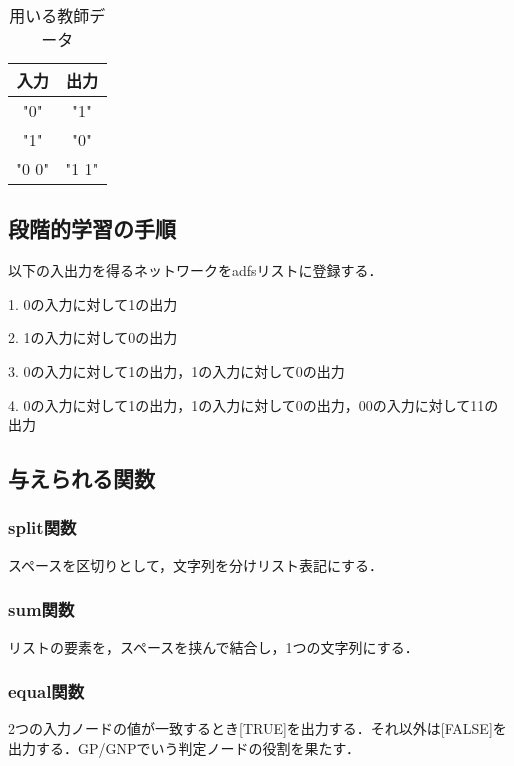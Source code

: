 \documentclass[exploratorypaper]{jsaiart} %
\begin{document}
\begin{table}[htbp]
\centering
\caption{用いる教師データ}
\label{tbl:result}
\begin{tabular}{cc}
    \hline
     入力 & 出力 \\
    \hline
    "0" & "1" \\
    "1" & "0" \\
    "0 0" & "1 1" \\
    \hline
\end{tabular}
\end{table}

\subsection{段階的学習の手順}
以下の入出力を得るネットワークをadfsリストに登録する．

1. 0の入力に対して1の出力

2. 1の入力に対して0の出力

3. 0の入力に対して1の出力，1の入力に対して0の出力

4. 0の入力に対して1の出力，1の入力に対して0の出力，00の入力に対して11の出力

\subsection{与えられる関数}
\subsubsection{split関数}
スペースを区切りとして，文字列を分けリスト表記にする．


\subsubsection{sum関数}
リストの要素を，スペースを挟んで結合し，1つの文字列にする．

\subsubsection{equal関数}
2つの入力ノードの値が一致するとき[TRUE]を出力する．それ以外は[FALSE]を出力する．GP/GNPでいう判定ノードの役割を果たす．
\end{document}
